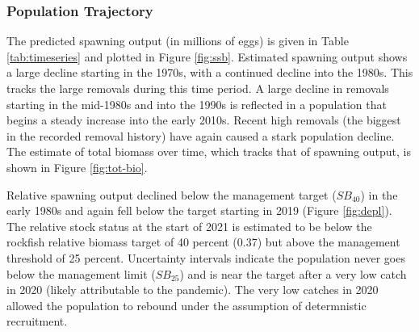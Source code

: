 \documentclass[11pt,
  english,
  a4paper,
]{article}
\begin{document}
\leavevmode\tagmcend\tagstructend\par


\hypertarget{population-trajectory}{%
\subsubsection{Population Trajectory}\label{population-trajectory}}

\leavevmode\tagmcend\tagstructend


The predicted spawning output (in millions of eggs) is given in Table \ref{tab:timeseries} and plotted in Figure \ref{fig:ssb}. Estimated spawning output shows a large decline starting in the 1970s, with a continued decline into the 1980s. This tracks the large removals during this time period. A large decline in removals starting in the mid-1980s and into the 1990s is reflected in a population that begins a steady increase into the early 2010s. Recent high removals (the biggest in the recorded removal history) have again caused a stark population decline. The estimate of total biomass over time, which tracks that of spawning output, is shown in Figure \ref{fig:tot-bio}.

\leavevmode\tagmcend\tagstructend\par


Relative spawning output declined below the management target ({\(SB_40%
\)\leavevmode\tagmcend\tagstructend}) in the early 1980s and again fell below the target starting in 2019 (Figure \ref{fig:depl}). The relative stock status at the start of 2021 is estimated to be below the rockfish relative biomass target of 40 percent (0.37) but above the management threshold of 25 percent. Uncertainty intervals indicate the population never goes below the management limit ({\(SB_25%
\)\leavevmode\tagmcend\tagstructend}) and is near the target after a very low catch in 2020 (likely attributable to the pandemic). The very low catches in 2020 allowed the population to rebound under the assumption of determnistic recruitment.

\leavevmode\tagmcend\tagstructend\par

\end{document}
